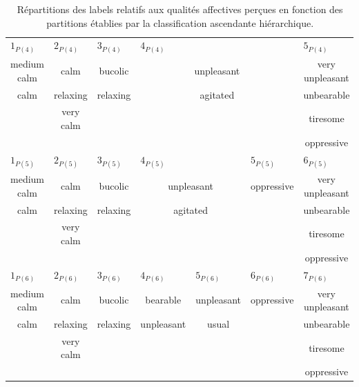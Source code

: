 \begin{table}[t]
\begin{tabular}{c|c|c|c|c|c|c}
\hline
\multicolumn{1}{l|}{$1_{P(4)}$} & \multicolumn{1}{l|}{$2_{P(4)}$} & \multicolumn{1}{l|}{$3_{P(4)}$}  & \multicolumn{3}{l|}{$4_{P(4)}$} & \multicolumn{1}{l}{$5_{P(4)}$} \\
medium calm         & calm       & bucolic  & \multicolumn{3}{c|}{unpleasant} & very unpleasant\\
calm                & relaxing   & relaxing & \multicolumn{3}{c|}{agitated}   & unbearable\\
                    & very calm  &          & \multicolumn{3}{c|}{}           & tiresome\\
                    &            &          & \multicolumn{3}{c|}{}           & oppressive\\                                      
\hline
\multicolumn{1}{l|}{$1_{P(5)}$} & \multicolumn{1}{l|}{$2_{P(5)}$} & \multicolumn{1}{l|}{$3_{P(5)}$}  & \multicolumn{2}{l|}{$4_{P(5)}$} & \multicolumn{1}{l|}{$5_{P(5)}$} & \multicolumn{1}{l}{$6_{P(5)}$}\\ 
medium calm          & calm      & bucolic  & \multicolumn{2}{c|}{unpleasant} & oppressive & very unpleasant\\     
calm                 & relaxing  & relaxing & \multicolumn{2}{c|}{agitated}   &            & unbearable\\  
                     & very calm &          & \multicolumn{2}{c|}{}           &            & tiresome \\  
                     &           &          & \multicolumn{2}{c|}{}           &            & oppressive \\               
\hline
\multicolumn{1}{l|}{$1_{P(6)}$} & \multicolumn{1}{l|}{$2_{P(6)}$} & \multicolumn{1}{l|}{$3_{P(6)}$}  & \multicolumn{1}{l|}{$4_{P(6)}$} & \multicolumn{1}{l|}{$5_{P(6)}$} & \multicolumn{1}{l|}{$6_{P(6)}$} & \multicolumn{1}{l}{$7_{P(6)}$} \\  
medium calm          & calm      & bucolic  & bearable    & unpleasant  & oppressive & very unpleasant \\        
calm                 & relaxing  & relaxing & unpleasant  & usual       &            & unbearable \\  
                     & very calm &          &             &             &            & tiresome\\  
                     &           &          &             &             &            & oppressive \\  
\hline
\end{tabular}
\vspace{0.5mm}
\caption{Répartitions des labels relatifs aux qualités affectives perçues en fonction des partitions établies par la classification ascendante hiérarchique.}
\label{tab:markerHacQualite}
\end{table}

